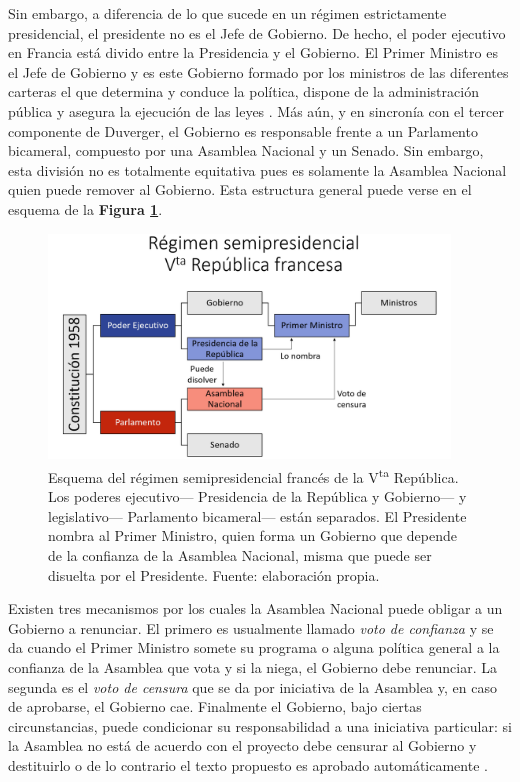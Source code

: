 Sin embargo, a diferencia de lo que sucede en un régimen estrictamente presidencial, el presidente no es el Jefe de Gobierno. De hecho, el poder ejecutivo en Francia está divido entre la Presidencia y el Gobierno. El Primer Ministro es el Jefe de Gobierno y es este Gobierno formado por los ministros de las diferentes carteras el que determina y conduce la política, dispone de la administración pública y asegura la ejecución de las leyes \parencite{ConstFr}. Más aún, y en sincronía con el tercer componente de Duverger, el Gobierno es responsable frente a un Parlamento bicameral, compuesto por una Asamblea Nacional y un Senado. Sin embargo, esta división no es totalmente equitativa pues es solamente la Asamblea Nacional quien puede remover al Gobierno. Esta estructura general puede verse en el esquema de la \textbf{Figura \ref{fig:Regimen_Semipresidencial_VRepFr}}.\\ 

\begin{figure}[H]
\centering
	\includegraphics[width = 0.95\textwidth]{Figs/FN_Francia/RegSemiPresFrVta}
	\caption{Esquema del régimen semipresidencial francés de la V\textsuperscript{ta} República. Los poderes ejecutivo--- Presidencia de la República y Gobierno--- y legislativo--- Parlamento bicameral--- están separados. El Presidente nombra al Primer Ministro, quien forma un Gobierno que depende de la confianza de la Asamblea Nacional, misma que puede ser disuelta por el Presidente. Fuente: elaboración propia.}
	\label{fig:Regimen_Semipresidencial_VRepFr}	
\end{figure}


Existen tres mecanismos por los cuales la Asamblea Nacional puede obligar a un Gobierno a renunciar. El primero es usualmente llamado \textit{voto de confianza} y se da cuando el Primer Ministro somete su programa o alguna política general a la confianza de la Asamblea que vota y si la niega, el Gobierno debe renunciar. La segunda es el \textit{voto de censura} que se da por iniciativa de la Asamblea y, en caso de aprobarse, el Gobierno cae. Finalmente el Gobierno, bajo ciertas circunstancias, puede condicionar su responsabilidad a una iniciativa particular: si la Asamblea no está de acuerdo con el proyecto debe censurar al Gobierno y destituirlo o de lo contrario el texto propuesto es aprobado automáticamente \parencite{AN17c}.\\


